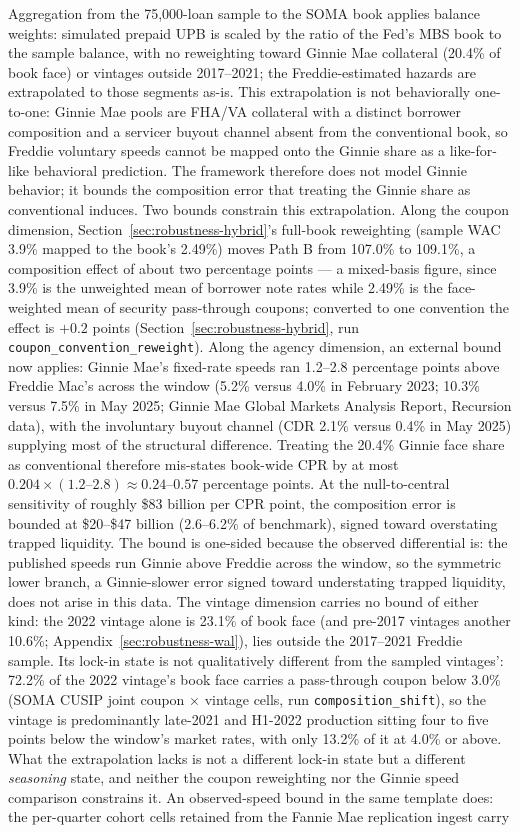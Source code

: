 \documentclass[12pt]{article}
\begin{document}
Aggregation from the 75,000-loan sample to the SOMA book applies balance weights: simulated prepaid UPB is scaled by the ratio of the Fed's MBS book to the sample balance, with no reweighting toward Ginnie Mae collateral (20.4\% of book face) or vintages outside 2017--2021; the Freddie-estimated hazards are extrapolated to those segments as-is. This extrapolation is not behaviorally one-to-one: Ginnie Mae pools are FHA/VA collateral with a distinct borrower composition and a servicer buyout channel absent from the conventional book, so Freddie voluntary speeds cannot be mapped onto the Ginnie share as a like-for-like behavioral prediction. The framework therefore does not model Ginnie behavior; it bounds the composition error that treating the Ginnie share as conventional induces. Two bounds constrain this extrapolation. Along the coupon dimension, Section~\ref{sec:robustness-hybrid}'s full-book reweighting (sample WAC 3.9\% mapped to the book's 2.49\%) moves Path B from 107.0\% to 109.1\%, a composition effect of about two percentage points --- a mixed-basis figure, since 3.9\% is the unweighted mean of borrower note rates while 2.49\% is the face-weighted mean of security pass-through coupons; converted to one convention the effect is $+0.2$ points (Section~\ref{sec:robustness-hybrid}, run \texttt{coupon\_convention\_reweight}). Along the agency dimension, an external bound now applies: Ginnie Mae's fixed-rate speeds ran 1.2--2.8 percentage points above Freddie Mac's across the window (5.2\% versus 4.0\% in February 2023; 10.3\% versus 7.5\% in May 2025; Ginnie Mae Global Markets Analysis Report, Recursion data), with the involuntary buyout channel (CDR 2.1\% versus 0.4\% in May 2025) supplying most of the structural difference. Treating the 20.4\% Ginnie face share as conventional therefore mis-states book-wide CPR by at most $0.204 \times (1.2\text{--}2.8) \approx 0.24$--$0.57$ percentage points. At the null-to-central sensitivity of roughly \$83 billion per CPR point, the composition error is bounded at \$20--\$47 billion (2.6--6.2\% of benchmark), signed toward overstating trapped liquidity. The bound is one-sided because the observed differential is: the published speeds run Ginnie above Freddie across the window, so the symmetric lower branch, a Ginnie-slower error signed toward understating trapped liquidity, does not arise in this data. The vintage dimension carries no bound of either kind: the 2022 vintage alone is 23.1\% of book face (and pre-2017 vintages another 10.6\%; Appendix~\ref{sec:robustness-wal}), lies outside the 2017--2021 Freddie sample. Its lock-in state is not qualitatively different from the sampled vintages': 72.2\% of the 2022 vintage's book face carries a pass-through coupon below 3.0\% (SOMA CUSIP joint coupon $\times$ vintage cells, run \texttt{composition\_shift}), so the vintage is predominantly late-2021 and H1-2022 production sitting four to five points below the window's market rates, with only 13.2\% of it at 4.0\% or above. What the extrapolation lacks is not a different lock-in state but a different \emph{seasoning} state, and neither the coupon reweighting nor the Ginnie speed comparison constrains it. An observed-speed bound in the same template does: the per-quarter cohort cells retained from the Fannie Mae replication ingest carry 
\end{document}
